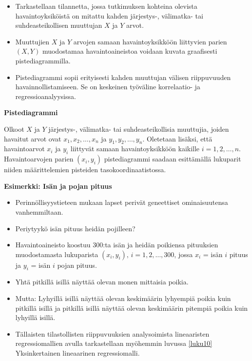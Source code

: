 \documentclass[
]{book}
\providecommand{\tightlist}{%
  \setlength{\itemsep}{0pt}\setlength{\parskip}{0pt}}
\begin{document}
\begin{itemize}
\item
  Tarkastellaan tilannetta, jossa tutkimuksen kohteina olevista havaintoyksiköistä on mitattu kahden järjestys-, välimatka- tai suhdeasteikollisen muuttujan \(X\) ja \(Y\) arvot.
\item
  Muuttujien \(X\) ja \(Y\) arvojen samaan havaintoyksikköön liittyvien parien \((X,Y)\) muodostamaa havaintoaineistoa voidaan kuvata graafisesti pistediagrammilla.
\item
  Pistediagrammi sopii erityisesti kahden muuttujan välisen riippuvuuden havainnollistamiseen. Se on keskeinen työväline korrelaatio- ja regressioanalyysissa.
\end{itemize}

\begin{defblock}{}
\textbf{Pistediagrammi}

Olkoot \(X\) ja \(Y\) järjestys-, välimatka- tai suhdeasteikollisia muuttujia, joiden havaitut arvot ovat \(x_1, x_2, \ldots, x_n\) ja \(y_1, y_2, \ldots, y_n\). Oletetaan lisäksi, että havaintoarvot \(x_i\) ja \(y_i\) liittyvät samaan havaintoyksikköön kaikille \(i = 1, 2, \ldots, n\). Havaintoarvojen parien \((x_i, y_i)\) pistediagrammi saadaan esittämällä lukuparit niiden määrittelemien pisteiden tasokoordinaatistossa.

\end{defblock}

\newpage

\begin{eblock}{}

\textbf{Esimerkki: Isän ja pojan pituus}

\begin{itemize}
\tightlist
\item
  Perinnöllisyystieteen mukaan lapset perivät geneettiset ominaisuutensa vanhemmiltaan.
\item
  Periytyykö isän pituus heidän pojilleen?
\item
  Havaintoaineisto koostuu 300:ta isän ja heidän poikiensa pituuksien muodostamasta lukuparista \((x_i , y_i),\, i = 1, 2, \ldots, 300\), jossa \(x_i\) = isän \(i\) pituus ja \(y_i\) = isän \(i\) pojan pituus.
\item
  Yhtä pitkillä isillä näyttää olevan monen mittaisia poikia.
\item
  Mutta: Lyhyillä isillä näyttää olevan keskimäärin lyhyempiä poikia kuin pitkillä isillä ja pitkillä isillä näyttää olevan keskimäärin pitempiä poikia kuin lyhyillä isillä.
\item
  Tällaisten tilastollisten riippuvuuksien analysoimista lineaaristen regressiomallien avulla tarkastellaan myöhemmin luvussa \ref{luku10} Yksinkertainen lineaarinen regressiomalli.
\end{itemize}

\end{eblock}
\end{document}
